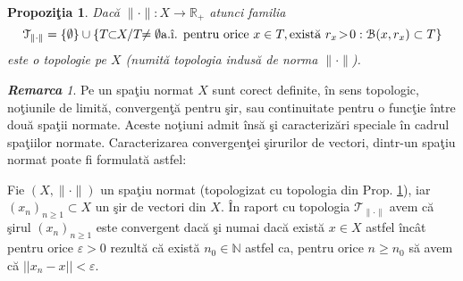 \documentclass[ a4paper, 12pt]{report}
\newtheorem{prop}[theorem]{\bf Propozi\c tia }
\theoremstyle{remark}
\newtheorem{remarc}{\bf Remarca}[section]
\numberwithin{equation}{section}
\begin{document}
\begin{prop}\label{top}
Dac\u a $\lVert \cdot \rVert : X \rightarrow \mathbb{R}_{+}$ atunci familia
\[\mathcal{T}_{\lVert \cdot \rVert} = \{\emptyset\} \cup \{T \!\!\subset\!\! X / T \!\!\not= \emptyset \hbox{a.\^ i. pentru orice }  x \in T, \hbox{exist\u a } r_x\! > \!0 : \mathcal{B}(x,r_x) \subset T \}\] este o topologie pe $X$ (numit\u a topologia indus\u a de norma $\lVert \cdot \rVert$).
\end{prop}
\begin{remarc}
Pe un spa\c tiu normat $X$ sunt corect definite, \^in sens topologic, no\c tiunile de limit\u a, convergen\c t\u a pentru \c sir, sau continuitate pentru o func\c tie \^intre dou\u a spa\c tii normate.
Aceste no\c tiuni admit \^ins\u a \c si caracteriz\u ari speciale \^in cadrul spa\c tiilor normate.
Caracterizarea convergen\c tei \c sirurilor de vectori, dintr-un spa\c tiu normat poate fi formulat\u a astfel:

Fie $(X,\lVert \cdot \rVert)$ un spa\c tiu normat (topologizat cu topologia din Prop. \ref{top}), iar $(x_n)_{n \geq 1} \subset X$ un \c sir de vectori din $X$.
\^In raport cu topologia $\mathcal{T}_{\lVert \cdot \rVert}$ avem c\u a \c sirul $(x_n)_{n \geq 1}$ este convergent dac\u a \c si numai dac\u a
exist\u a $x \in X$ astfel \^inc\^at pentru orice $\varepsilon > 0$ rezult\u a c\u  a exist\u a $n_0 \in \mathbb{N}$ astfel ca, pentru orice $n\geq n_0$ s\u a avem c\u a $||x_n - x|| < \varepsilon$.
\end{remarc}
\end{document}
